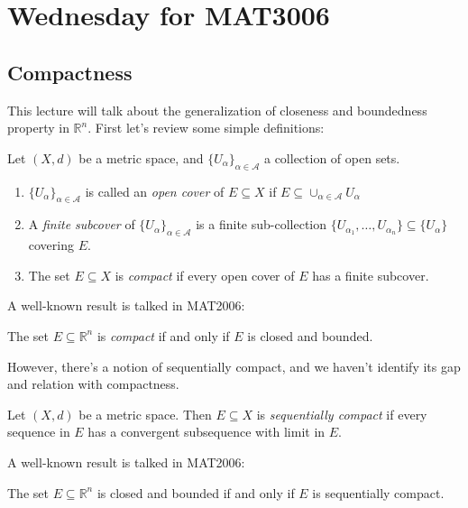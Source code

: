 \section{Wednesday for MAT3006}
\subsection{Compactness}
This lecture will talk about the generalization of closeness and boundedness property in $\mathbb{R}^n$. First let's review some simple definitions:

\begin{definition}[Compact]
Let $(X,d)$ be a metric space, and $\{U_\alpha\}_{\alpha\in\mathcal{A}}$ a collection of open sets.
\begin{enumerate}
\item
$\{U_\alpha\}_{\alpha\in\mathcal{A}}$ is called an \emph{open cover} of $E\subseteq X$ if $E\subseteq\cup_{\alpha\in\mathcal{A}}U_\alpha$
\item
A \emph{finite subcover} of $\{U_\alpha\}_{\alpha\in\mathcal{A}}$ is a finite sub-collection 
$\{U_{\alpha_1},\dots,U_{\alpha_n}\}\subseteq\{U_\alpha\}$ covering $E$.
\item
The set $E\subseteq X$ is \emph{compact} if every open cover of $E$ has a finite subcover.
\end{enumerate}
\end{definition}

A well-known result is talked in MAT2006:

\begin{theorem}
The set $E\subseteq\mathbb{R}^n$ is \emph{compact} if and only if $E$ is closed and bounded.
\end{theorem}

However, there's a notion of sequentially compact, and we haven't identify its gap and relation with compactness.

\begin{definition}
Let $(X,d)$ be a metric space. Then $E\subseteq X$ is \emph{sequentially compact} if every sequence in $E$ has a convergent subsequence with limit in $E$.
\end{definition}

A well-known result is talked in MAT2006:
\begin{theorem}
The set $E\subseteq\mathbb{R}^n$ is closed and bounded if and only if $E$ is sequentially compact.
\end{theorem}

